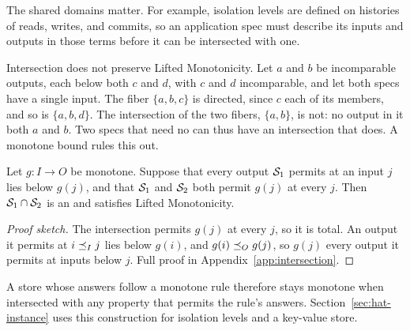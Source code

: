 The shared domains matter.  For example, isolation levels are defined on
histories of reads, writes, and commits, so an application spec must describe
its inputs and outputs in those terms before it can be intersected with one.

Intersection does not preserve Lifted Monotonicity.  Let $a$ and $b$ be
incomparable outputs, each below both $c$ and $d$, with $c$ and $d$
incomparable, and let both specs have a single input.  The fiber $\{a,b,c\}$ is
directed, since $c$ \outrel each of its members, and so is $\{a,b,d\}$.  The
intersection of the two fibers, $\{a,b\}$, is not: no output in it \outrel
both $a$ and $b$.  Two specs that need no \commitment can thus have an
intersection that does.  A
monotone bound rules this out.

\begin{proposition}
\label{prop:intersection-bound}
Let $g:I\to O$ be monotone.  Suppose that every output $\mathcal{S}_1$ permits at an
input $j$ lies below $g(j)$, and that $\mathcal{S}_1$ and $\mathcal{S}_2$ both permit $g(j)$
at every $j$.  Then $\mathcal{S}_1\cap\mathcal{S}_2$ is an \spectype and satisfies Lifted
Monotonicity.
\end{proposition}

\begin{proof}[Proof sketch]
The intersection permits $g(j)$ at every $j$, so it is total.  An output it
permits at $i\preceq_I j$ lies below $g(i)$, and $g(i)\preceq_O g(j)$, so
$g(j)$ \outrel every output it permits at inputs below $j$.  Full proof in
Appendix~\ref{app:intersection}.
\end{proof}

A store whose answers follow a monotone rule therefore stays monotone when
intersected with any property that permits the rule's answers.
Section~\ref{sec:hat-instance} uses this construction for isolation levels and
a key-value store.
